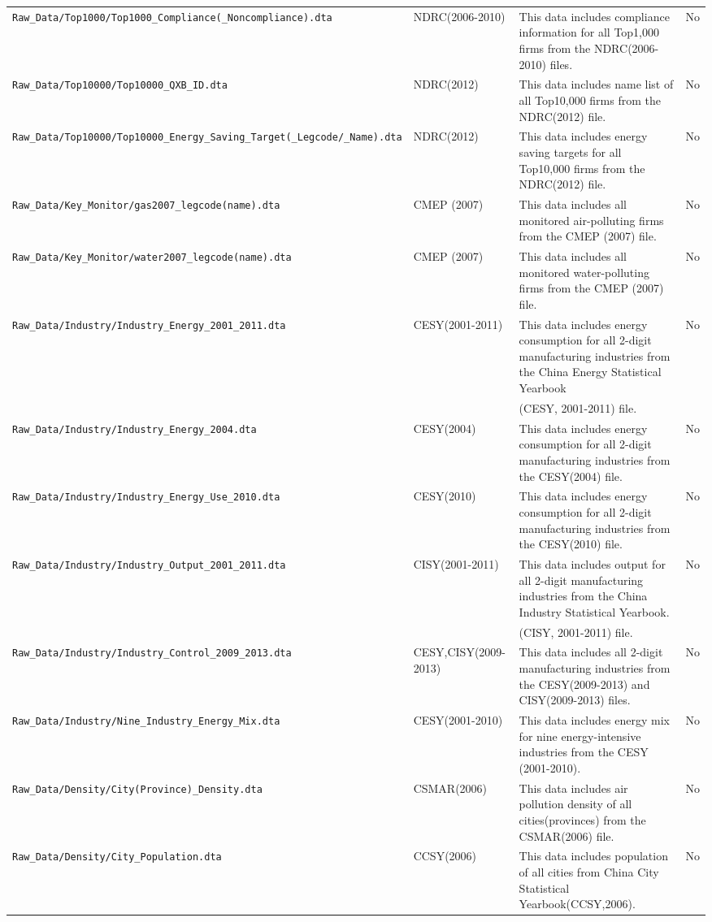 \documentclass[12pt,notitlepage]{article}
\begin{document}
\begin{landscape}
\begin{table}[htbp]
{\begin{tabular}{llll}
\texttt{Raw\_Data/Top1000/Top1000\_Compliance(\_Noncompliance).dta} & NDRC(2006-2010) & This data includes compliance information for all Top1,000 firms from the NDRC(2006-2010) files. & No \\
\texttt{Raw\_Data/Top10000/Top10000\_QXB\_ID.dta} & NDRC(2012) & This data includes name list of all Top10,000 firms from the NDRC(2012) file. & No \\
\texttt{Raw\_Data/Top10000/Top10000\_Energy\_Saving\_Target(\_Legcode/\_Name).dta} & NDRC(2012) & This data includes energy saving targets for all Top10,000 firms from the NDRC(2012) file. & No \\
\texttt{Raw\_Data/Key\_Monitor/gas2007\_legcode(name).dta} & CMEP (2007) & This data includes all monitored air-polluting firms from the CMEP (2007) file. & No \\
\texttt{Raw\_Data/Key\_Monitor/water2007\_legcode(name).dta} & CMEP (2007) & This data includes all monitored water-polluting firms from the CMEP (2007) file. & No \\
\texttt{Raw\_Data/Industry/Industry\_Energy\_2001\_2011.dta} & CESY(2001-2011) & This data includes energy consumption for all 2-digit manufacturing industries from the China Energy Statistical Yearbook & No \\
		&& (CESY, 2001-2011) file. \\
\texttt{Raw\_Data/Industry/Industry\_Energy\_2004.dta} & CESY(2004) & This data includes energy consumption for all 2-digit manufacturing industries from the CESY(2004) file. & No \\
\texttt{Raw\_Data/Industry/Industry\_Energy\_Use\_2010.dta} & CESY(2010) & This data includes energy consumption for all 2-digit manufacturing industries from the CESY(2010) file. & No \\
\texttt{Raw\_Data/Industry/Industry\_Output\_2001\_2011.dta} & CISY(2001-2011) & This data includes output for all 2-digit manufacturing industries from the China Industry Statistical Yearbook. & No \\ 
		&& (CISY, 2001-2011) file. \\
\texttt{Raw\_Data/Industry/Industry\_Control\_2009\_2013.dta} & CESY,CISY(2009-2013) & This data includes all 2-digit manufacturing industries from the CESY(2009-2013) and  CISY(2009-2013) files. & No \\
\texttt{Raw\_Data/Industry/Nine\_Industry\_Energy\_Mix.dta} & CESY(2001-2010) & This data includes energy mix for nine energy-intensive industries from the CESY (2001-2010). & No \\
\texttt{Raw\_Data/Density/City(Province)\_Density.dta} & CSMAR(2006) & This data includes air pollution density of all cities(provinces) from the CSMAR(2006) file. & No \\
\texttt{Raw\_Data/Density/City\_Population.dta} & CCSY(2006) & This data includes population of all cities from China City Statistical Yearbook(CCSY,2006). & No \\
		\bottomrule
	\end{tabular}}
\end{table}
\end{landscape}
\end{document}

